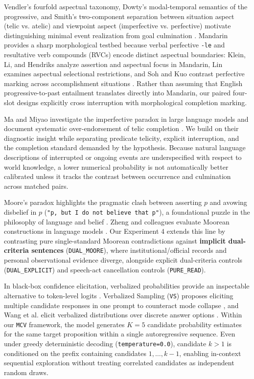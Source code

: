 \documentclass[11pt,a4paper]{article}
\begin{document}
Vendler's fourfold aspectual taxonomy, Dowty's modal-temporal semantics of the progressive, and Smith's two-component separation between situation aspect (telic vs. atelic) and viewpoint aspect (imperfective vs. perfective) motivate distinguishing minimal event realization from goal culmination \citep{vendler1957,dowty1979,smith1997}. Mandarin provides a sharp morphological testbed because verbal perfective \texttt{-\allowbreak{}le} and resultative verb compounds (RVCs) encode distinct aspectual boundaries: Klein, Li, and Hendriks analyze assertion and aspectual focus in Mandarin, Lin examines aspectual selectional restrictions, and Soh and Kuo contrast perfective marking across accomplishment situations \citep{klein2000,lin2003aspectual,soh2005}. Rather than assuming that English progressive-to-past entailment translates directly into Mandarin, our paired four-slot designs explicitly cross interruption with morphological completion marking.

Ma and Miyao investigate the imperfective paradox in large language models and document systematic over-endorsement of telic completion \citep{ma2026}. We build on their diagnostic insight while separating predicate telicity, explicit interruption, and the completion standard demanded by the hypothesis. Because natural language descriptions of interrupted or ongoing events are underspecified with respect to world knowledge, a lower numerical probability is not automatically better calibrated unless it tracks the contrast between occurrence and culmination across matched pairs.

Moore's paradox highlights the pragmatic clash between asserting $p$ and avowing disbelief in $p$ (\texttt{"p, but I do not believe that p"}), a foundational puzzle in the philosophy of language and belief \citep{moore1942,williams1979}. Zheng and colleagues evaluate Moorean constructions in language models \citep{zheng2026}. Our Experiment 4 extends this line by contrasting pure single-standard Moorean contradictions against \textbf{implicit dual-criteria sentences} (\texttt{DUAL\_\allowbreak{}MOORE}), where institutional/official records and personal observational evidence diverge, alongside explicit dual-criteria controls (\texttt{DUAL\_\allowbreak{}EXPLICIT}) and speech-act cancellation controls (\texttt{PURE\_\allowbreak{}READ}).

In black-box confidence elicitation, verbalized probabilities provide an inspectable alternative to token-level logits \citep{tian2023,xiong2024}. Verbalized Sampling (\texttt{VS}) proposes eliciting multiple candidate responses in one prompt to counteract mode collapse \citep{zhang2025}, and Wang et al. elicit verbalized distributions over discrete answer options \citep{wang2026}. Within our \texttt{MCV} framework, the model generates $K=5$ candidate probability estimates for the same target proposition within a single autoregressive sequence. Even under greedy deterministic decoding (\texttt{temperature=\allowbreak{}0.0}), candidate $k>1$ is conditioned on the prefix containing candidates $1,\dots,k-1$, enabling in-context sequential exploration without treating correlated candidates as independent random draws.
\end{document}
